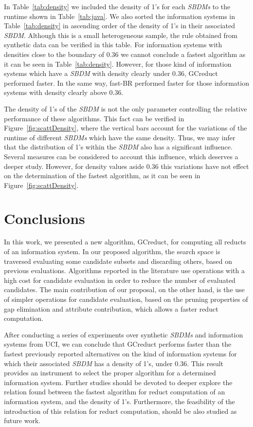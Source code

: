 \documentclass[number,preprint,review,12pt]{elsarticle}
\begin{document}
	\label{par:kind}
	In Table~\ref{tab:density} we included the density of 1's for each \textit{SBDMs} to the runtime shown in Table~\ref{tab:java}. We also sorted the information systems in Table~\ref{tab:density} in ascending order of the density of 1's in their associated \textit{SBDM}. Although this is a small heterogeneous sample, the rule obtained from synthetic data can be verified in this table. For information systems with densities close to the boundary of 0.36 we cannot conclude a fastest algorithm as it can be seen in Table~\ref{tab:density}. However, for those kind of information systems which have a \textit{SBDM} with density clearly under 0.36, GCreduct performed faster. In the same way, fast-BR performed faster for those information systems with density clearly above 0.36.
	
	The density of 1's of the \textit{SBDM} is not the only parameter controlling the relative performance of these algorithms. This fact can be verified in Figure~\ref{fig:scattDensity}, where the vertical bars account for the variations of the runtime of different \textit{SBDMs} which have the same density. Thus, we may infer that the distribution of 1's within the \textit{SBDM} also has a significant influence. Several measures can be considered to account this influence, which deserves a deeper study. However, for density values aside 0.36 this variations have not effect on the determination of the fastest algorithm, as it can be seen in Figure~\ref{fig:scattDensity}.\label{par:distribution}

\section{Conclusions}\label{conclusions}
	In this work, we presented a new algorithm, GCreduct, for computing all reducts of an information system. In our proposed algorithm, the search space is traversed evaluating some candidate subsets and discarding others, based on previous evaluations. Algorithms reported in the literature use operations with a high cost for candidate evaluation in order to reduce the number of evaluated candidates. The main contribution of our proposal, on the other hand, is the use of simpler operations for candidate evaluation, based on the pruning properties of gap elimination and attribute contribution, which allows a faster reduct computation. 
	
	After conducting a series of experiments over synthetic \textit{SBDMs} and information systems from UCI, we can conclude that GCreduct performs faster than the fastest previously reported alternatives on the kind of information systems for which their associated \textit{SBDM} has a density of 1's, under 0.36. This result provides an instrument to select the proper algorithm for a determined information system. Further studies should be devoted to deeper explore the relation found between the fastest algorithm for reduct computation of an information system, and the density of 1's. Furthermore, the feasibility of the introduction of this relation for reduct computation, should be also studied as future work.
\end{document}

